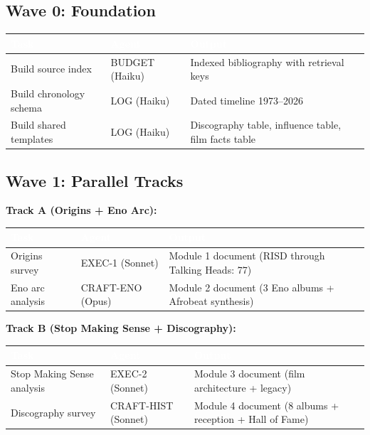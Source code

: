 \documentclass[11pt,letterpaper]{article}
\newcommand{\tableheader}[1]{\textbf{\sffamily\textcolor{white}{#1}}}
\begin{document}
\subsection{Wave 0: Foundation}

\begin{center}
\begin{tabularx}{\textwidth}{L{3cm}L{2.5cm}X}
\toprule
{}
\tableheader{Task} & \tableheader{Agent} & \tableheader{Output} \\
\midrule
Build source index & BUDGET (Haiku) & Indexed bibliography with retrieval keys \\
Build chronology schema & LOG (Haiku) & Dated timeline 1973--2026 \\
Build shared templates & LOG (Haiku) & Discography table, influence table, film facts table \\
\bottomrule
\end{tabularx}
\end{center}

\subsection{Wave 1: Parallel Tracks}

\textbf{Track A (Origins + Eno Arc):}

\begin{center}
\begin{tabularx}{\textwidth}{L{3cm}L{2.5cm}X}
\toprule
{}
\tableheader{Task} & \tableheader{Agent} & \tableheader{Output} \\
\midrule
Origins survey & EXEC-1 (Sonnet) & Module 1 document (RISD through Talking Heads: 77) \\
Eno arc analysis & CRAFT-ENO (Opus) & Module 2 document (3 Eno albums + Afrobeat synthesis) \\
\bottomrule
\end{tabularx}
\end{center}

\textbf{Track B (Stop Making Sense + Discography):}

\begin{center}
\begin{tabularx}{\textwidth}{L{3cm}L{2.5cm}X}
\toprule
{}
\tableheader{Task} & \tableheader{Agent} & \tableheader{Output} \\
\midrule
Stop Making Sense analysis & EXEC-2 (Sonnet) & Module 3 document (film architecture + legacy) \\
Discography survey & CRAFT-HIST (Sonnet) & Module 4 document (8 albums + reception + Hall of Fame) \\
\bottomrule
\end{tabularx}
\end{center}
\end{document}
